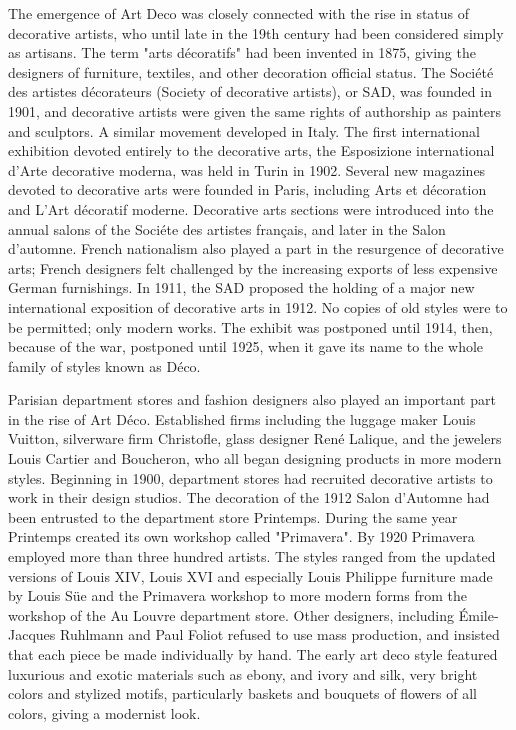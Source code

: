 The emergence of Art Deco was closely connected with the rise in status
of decorative artists, who until late in the 19th century had been
considered simply as artisans. The term "arts décoratifs" had been
invented in 1875, giving the designers of furniture, textiles, and other
decoration official status. The Société des artistes décorateurs
(Society of decorative artists), or SAD, was founded in 1901, and
decorative artists were given the same rights of authorship as painters
and sculptors. A similar movement developed in Italy. The first
international exhibition devoted entirely to the decorative arts, the
Esposizione international d'Arte decorative moderna, was held in Turin
in 1902. Several new magazines devoted to decorative arts were founded
in Paris, including Arts et décoration and L'Art décoratif moderne.
Decorative arts sections were introduced into the annual salons of the
Sociéte des artistes français, and later in the Salon d'automne. French
nationalism also played a part in the resurgence of decorative arts;
French designers felt challenged by the increasing exports of less
expensive German furnishings. In 1911, the SAD proposed the holding of a
major new international exposition of decorative arts in 1912. No copies
of old styles were to be permitted; only modern works. The exhibit was
postponed until 1914, then, because of the war, postponed until 1925,
when it gave its name to the whole family of styles known as Déco.

Parisian department stores and fashion designers also played an
important part in the rise of Art Déco. Established firms including the
luggage maker Louis Vuitton, silverware firm Christofle, glass designer
René Lalique, and the jewelers Louis Cartier and Boucheron, who all
began designing products in more modern styles. Beginning in 1900,
department stores had recruited decorative artists to work in their
design studios. The decoration of the 1912 Salon d'Automne had been
entrusted to the department store Printemps. During the same year
Printemps created its own workshop called "Primavera". By 1920 Primavera
employed more than three hundred artists. The styles ranged from the
updated versions of Louis XIV, Louis XVI and especially Louis Philippe
furniture made by Louis Süe and the Primavera workshop to more modern
forms from the workshop of the Au Louvre department store. Other
designers, including Émile-Jacques Ruhlmann and Paul Foliot refused to
use mass production, and insisted that each piece be made individually
by hand. The early art deco style featured luxurious and exotic
materials such as ebony, and ivory and silk, very bright colors and
stylized motifs, particularly baskets and bouquets of flowers of all
colors, giving a modernist look.

